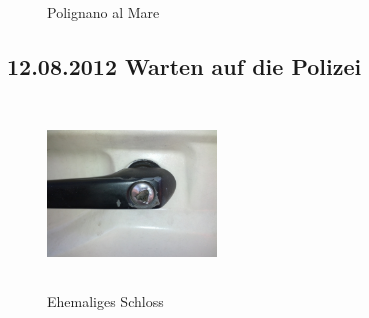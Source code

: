 \begin{figure}[H]
   \centering
   \quad
   \quad
   \quad
   \caption[Polignano al Mare]{Polignano al Mare}
\end{figure}

\subsection{12.08.2012 Warten auf die Polizei}

\begin{figure} 
  \begin{centering}
    \includegraphics[width=0.4\textwidth, height=5cm, keepaspectratio]{../Bilder/Sommer2012/59.jpg}
    \caption{Ehemaliges Schloss}
  \end{centering}
\end{figure} 

